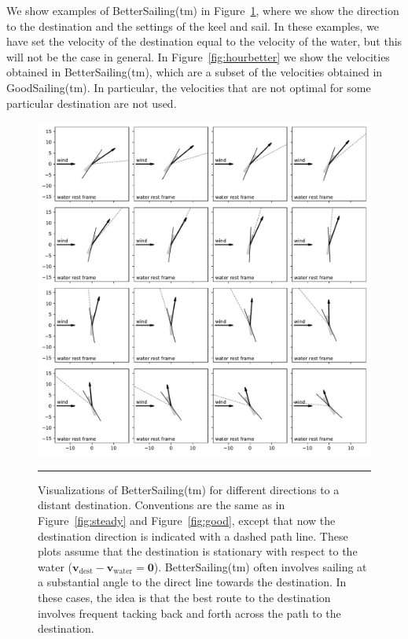 \documentclass[letterpaper]{article}
\renewcommand{\vec}[1]{\boldsymbol{#1}}
\newcommand{\water}{\text{water}}
\newcommand{\destination}{\text{dest}}
\newcommand{\vwater}{\vec{v}_\water}
\newcommand{\vdest}{\vec{v}_\destination}
\newcommand{\figref}[1]{Figure~\ref{#1}}
\newcommand{\figurerule}{\rule[1ex]{\textwidth}{0.2pt}}
\begin{document}
We show examples of BetterSailing(tm) in \figref{fig:better}, where we show the direction to the destination and the settings of the keel and sail.
In these examples, we have set the velocity of the destination equal to the velocity of the water, but this will not be the case in general.
In \figref{fig:hourbetter} we show the velocities obtained in BetterSailing(tm), which are a subset of the velocities obtained in GoodSailing(tm).
In particular, the velocities that are not optimal for some particular destination are not used.
\begin{figure}[t!]
  \includegraphics[width=\textwidth]{better.pdf}
  \caption{Visualizations of BetterSailing(tm) for different directions to a distant destination.
  Conventions are the same as in \figref{fig:steady} and \figref{fig:good}, except that now the destination direction is indicated with a dashed path line.
  These plots assume that the destination is stationary with respect to the water ($\vdest-\vwater=\vec{0}$).
  BetterSailing(tm) often involves sailing at a substantial angle to the direct line towards the destination.
  In these cases, the idea is that the best route to the destination involves frequent tacking back and forth across the path to the destination.\label{fig:better}}
  \figurerule
\end{figure}
\end{document}
